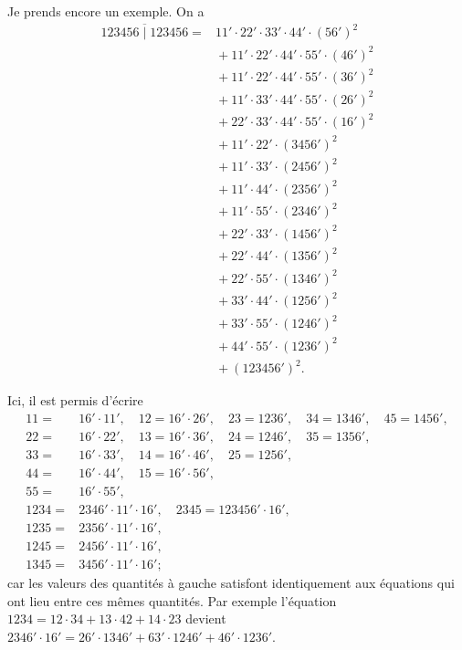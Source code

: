 \documentclass[11pt,a4paper]{article}
\begin{document}
\medskip

Je prends encore un exemple. On a
\begin{align*}
\overline{123456 \mid 123456} ={}& 11'\cdot 22'\cdot 33'\cdot 44'\cdot(56')^2\\
&{}+ 11'\cdot 22'\cdot 44'\cdot 55'\cdot(46')^2\\
&{}+ 11'\cdot 22'\cdot 44'\cdot 55'\cdot(36')^2\\
&{}+ 11'\cdot 33'\cdot 44'\cdot 55'\cdot(26')^2\\
&{}+ 22'\cdot 33'\cdot 44'\cdot 55'\cdot(16')^2\\
&{}+ 11'\cdot 22'\cdot(3456')^2\\
&{}+ 11'\cdot 33'\cdot(2456')^2\\
&{}+ 11'\cdot 44'\cdot(2356')^2\\
&{}+ 11'\cdot 55'\cdot(2346')^2\\
&{}+ 22'\cdot 33'\cdot(1456')^2\\
&{}+ 22'\cdot 44'\cdot(1356')^2\\
&{}+ 22'\cdot 55'\cdot(1346')^2\\
&{}+ 33'\cdot 44'\cdot(1256')^2\\
&{}+ 33'\cdot 55'\cdot(1246')^2\\
&{}+ 44'\cdot 55'\cdot(1236')^2\\
&{}+ (123456')^2.
\end{align*}

\medskip

Ici, il est permis d'\'ecrire
\begin{align*}
11 ={}& 16'\cdot 11',\quad 12 = 16'\cdot 26',\quad 23 = 1236',\quad 34 = 1346',\quad 45 = 1456',\\
22 ={}& 16'\cdot 22',\quad 13 = 16'\cdot 36',\quad 24 = 1246',\quad 35 = 1356',\\
33 ={}& 16'\cdot 33',\quad 14 = 16'\cdot 46',\quad 25 = 1256',\\
44 ={}& 16'\cdot 44',\quad 15 = 16'\cdot 56',\\
55 ={}& 16'\cdot 55',\\
1234 ={}& 2346'\cdot 11'\cdot 16',\quad 2345 = 123456'\cdot 16',\\
1235 ={}& 2356'\cdot 11'\cdot 16',\\
1245 ={}& 2456'\cdot 11'\cdot 16',\\
1345 ={}& 3456'\cdot 11'\cdot 16';
\end{align*}
car les valeurs des quantit\'es \`a gauche satisfont identiquement aux \'equations qui ont lieu entre ces m\^emes quantit\'es. Par exemple l'\'equation $1234 = 12\cdot 34 + 13\cdot 42 + 14\cdot 23$ devient $2346'\cdot 16' = 26'\cdot 1346' + 63'\cdot 1246' + 46'\cdot 1236'$.
\end{document}
